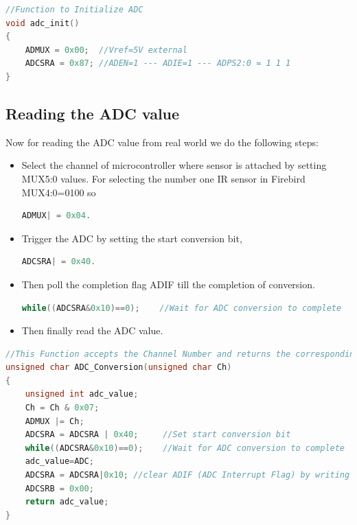 \begin{lstlisting}[language=C, caption=ADC initialization, escapechar=\~, frame=single]
//Function to Initialize ADC
void adc_init()
{
	ADMUX = 0x00;  //Vref=5V external 
	ADCSRA = 0x87; //ADEN=1 --- ADIE=1 --- ADPS2:0 = 1 1 1
}
\end{lstlisting}


\subsection{Reading the ADC value}
Now for reading the ADC value from real world we do the following steps:
\begin{itemize}
\item Select the channel of microcontroller where sensor is attached by setting MUX5:0 values.
For selecting the number one IR sensor in Firebird MUX4:0=0100 so 
\begin{lstlisting}[language=C, escapechar=\~, frame=single]
ADMUX| = 0x04.
\end{lstlisting}
\item Trigger the ADC by setting the start conversion bit,
\begin{lstlisting}[language=C, escapechar=\~, frame=single]
 ADCSRA| = 0x40.
\end{lstlisting}
\item Then poll the completion flag ADIF till the completion of conversion.
\begin{lstlisting}[language=C,escapechar=\~, frame=single]
	while((ADCSRA&0x10)==0);	//Wait for ADC conversion to complete
\end{lstlisting}

\item Then finally read the ADC value.
\end{itemize}

\begin{lstlisting}[language=C, caption=ADC initialization, escapechar=\~, frame=single]
//This Function accepts the Channel Number and returns the corresponding Analog Value 
unsigned char ADC_Conversion(unsigned char Ch)
{
	unsigned int adc_value;
	Ch = Ch & 0x07;  			
	ADMUX |= Ch;	   		
	ADCSRA = ADCSRA | 0x40;		//Set start conversion bit
	while((ADCSRA&0x10)==0);	//Wait for ADC conversion to complete
	adc_value=ADC;
	ADCSRA = ADCSRA|0x10; //clear ADIF (ADC Interrupt Flag) by writing 1 to it
	ADCSRB = 0x00;
	return adc_value;
}
\end{lstlisting}